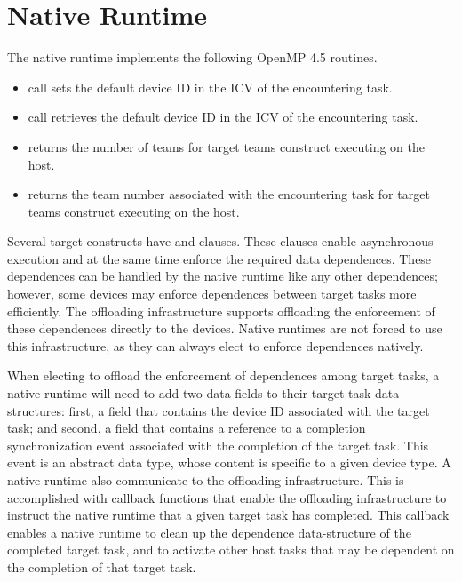 \section{Native Runtime}

The native runtime implements the following OpenMP 4.5 routines.

\begin{itemize}
  \item {} call sets the default device ID in the ICV of the encountering task.

  \item {} call retrieves the default device ID in the ICV of the encountering task.
 
  \item {} returns the number of teams for target teams construct executing on the host.
  
  \item {} returns the team number associated with the encountering task for target teams construct executing on the host.
 
\end{itemize}

Several target constructs have  and  clauses. These clauses enable asynchronous execution and at the same time enforce the required data dependences. These dependences can be handled by the native runtime like any other dependences; however, some devices may enforce dependences between target tasks more efficiently. The offloading infrastructure supports offloading the enforcement of these dependences directly to the devices. Native runtimes are not forced to use this infrastructure, as they can always elect to enforce dependences natively.

When electing to offload the enforcement of dependences among target tasks, a native runtime will need to add two data fields to their target-task data-structures: first,  a field that contains the device ID associated with the target task; and second, a field that contains a reference to a completion synchronization event associated with the completion of the target task. This event is an abstract data type, whose content is specific to a given device type. A native runtime also communicate to the offloading infrastructure. This is accomplished with callback functions that enable the offloading infrastructure to instruct the native runtime that a given target task has completed. This callback enables a native runtime to clean up the dependence data-structure of the completed target task, and to activate other host tasks that may be dependent on the completion of that target task.

